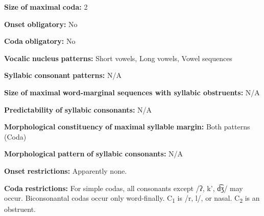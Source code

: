\documentclass[output=paper]{langsci/langscibook}
\begin{document}
\begin{styleBody}
\textbf{Size} \textbf{of} \textbf{maximal} \textbf{coda:} 2
\end{styleBody}

\begin{styleBody}
\textbf{Onset} \textbf{obligatory:} No
\end{styleBody}

\begin{styleBody}
\textbf{Coda} \textbf{obligatory:} No
\end{styleBody}

\begin{styleBody}
\textbf{Vocalic} \textbf{nucleus} \textbf{patterns:} Short vowels, Long vowels, Vowel sequences
\end{styleBody}

\begin{styleBody}
\textbf{Syllabic} \textbf{consonant} \textbf{patterns:} N/A
\end{styleBody}

\begin{styleBody}
\textbf{Size} \textbf{of} \textbf{maximal} \textbf{word{}-marginal sequences with syllabic obstruents:} N/A
\end{styleBody}

\begin{styleBody}
\textbf{Predictability} \textbf{of} \textbf{syllabic} \textbf{consonants:} N/A
\end{styleBody}

\begin{styleBody}
\textbf{Morphological} \textbf{constituency} \textbf{of} \textbf{maximal} \textbf{syllable} \textbf{margin:} Both patterns (Coda)
\end{styleBody}

\begin{styleBody}
\textbf{Morphological} \textbf{pattern} \textbf{of} \textbf{syllabic} \textbf{consonants:} N/A
\end{styleBody}

\begin{styleBody}
\textbf{Onset} \textbf{restrictions:} Apparently none.
\end{styleBody}

\begin{styleBody}
\textbf{Coda} \textbf{restrictions:} For simple codas, all consonants except /ʔ, k’, d͡ʒ/ may occur. Biconsonantal codas occur only word-finally. C\textsubscript{1} is /r, l/, or nasal. C\textsubscript{2} is an obstruent.
\end{styleBody}
\end{document}
